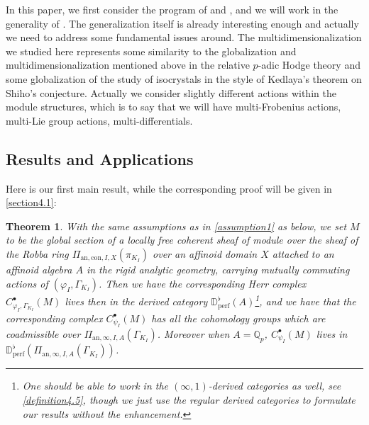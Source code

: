 \documentclass[12pt]{amsart}
\newtheorem{theorem}{Theorem}[section]
\theoremstyle{definition}
\numberwithin{equation}{section}
\begin{document}
\indent In this paper, we first consider the program of \cite{CKZ18} and \cite{PZ19}, and we will work in the generality of \cite{KPX}.  The generalization itself is already interesting enough and actually we need to address some fundamental issues around. The multidimensionalization we studied here represents some similarity to the globalization and multidimensionalization mentioned above in the relative $p$-adic Hodge theory and some globalization of the study of isocrystals in the style of Kedlaya's theorem on Shiho's conjecture. Actually we consider slightly different actions within the module structures, which is to say that we will have multi-Frobenius actions, multi-Lie group actions, multi-differentials. 

\subsection{Results and Applications}

\indent Here is our first main result, while the corresponding proof will be given in \cref{section4.1}:

\begin{theorem}
With the same assumptions as in \cref{assumption1} as below, we set $M$ to be the global section of a locally free coherent sheaf of module over the sheaf of the Robba ring $\Pi_{\mathrm{an},\mathrm{con},I,X}(\pi_{K_I})$ over an affinoid domain $X$ attached to an affinoid algebra $A$ in the rigid analytic geometry, carrying mutually commuting actions of $(\varphi_I,\Gamma_{K_I})$. Then we have the corresponding Herr complex $C^\bullet_{\varphi_I,\Gamma_{K_I}}(M)$ lives then in the derived category $\mathbb{D}^\flat_{\mathrm{perf}}(A)$\footnote{One should be able to work in the $(\infty,1)$-derived categories as well, see \cref{definition4.5}, though we just use the regular derived categories to formulate our results without the enhancement.}, and we have that the corresponding complex $C^\bullet_{\psi_I}(M)$ has all the cohomology groups which are coadmissible over $\Pi_{\mathrm{an},\infty,I,A}(\Gamma_{K_I})$. Moreover when $A=\mathbb{Q}_p$, $C^\bullet_{\psi_I}(M)$ lives in $\mathbb{D}^\flat_{\mathrm{perf}}(\Pi_{\mathrm{an},\infty,I,A}(\Gamma_{K_I}))$.
\end{theorem}
\end{document}
